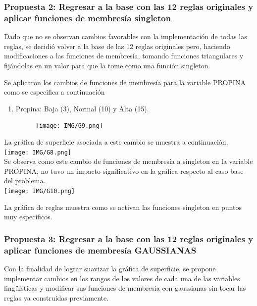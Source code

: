 \documentclass[11pt, letterpaper]{article}
\begin{document}
	
	\newpage
	
	\subsubsection{Propuesta 2: Regresar a la base con las 12 reglas originales y aplicar funciones de membresía singleton}
	
	Dado que no se observan cambios favorables con la implementación de todas las reglas, se decidió volver a la base de las 12 reglas originales pero, haciendo modificaciones a las funciones de membresía, tomando funciones triangulares y fijándolas en un valor para que la tome como una función singleton.
	
	Se aplicaron los cambios de funciones de membresía para la variable PROPINA como se especifica a continuación
	
	\begin{enumerate}
		\item Propina: Baja (3), Normal (10) y Alta (15).
		\begin{figure}[h]
			\centering
			\texttt{[image: IMG/G9.png]}
		\end{figure}
	\end{enumerate}
	
	
	\newpage 
	
	La gráfica de superficie asociada a este cambio se muestra a continuación. \\
	
	
	\texttt{[image: IMG/G8.png]} \\
	
	Se observa como este cambio de funciones de membresía a singleton en la variable PROPINA, no tuvo un impacto significativo en la gráfica respecto al caso base del problema. \\
	
	\texttt{[image: IMG/G10.png]}
	
	La gráfica de reglas muestra como se activan las funciones singleton en puntos muy específicos. \\
	
	
	
	\newpage
	
	\subsubsection{Propuesta 3: Regresar a la base con las 12 reglas originales y aplicar funciones de membresía GAUSSIANAS}
	
	Con la finalidad de lograr suavizar la gráfica de superficie, se propone implementar cambios en los rangos de los valores de cada una de las variables lingüísticas y modificar sus funciones de membresía con gaussianas sin tocar las reglas ya construidas previamente.
	
\end{document}
